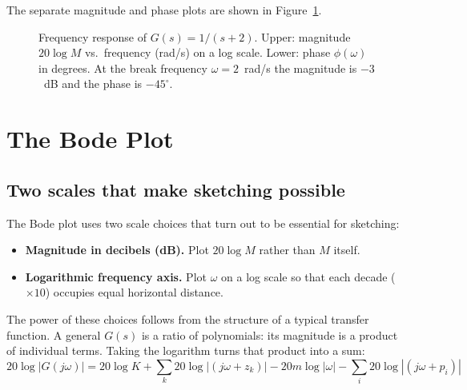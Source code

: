 \documentclass[../../book.tex]{subfiles}
\begin{document}
The separate magnitude and phase plots are shown in
Figure~\ref{fig:example_bode}.

\begin{figure}[htbp]
  \caption{Frequency response of $G(s) = 1/(s+2)$.  Upper: magnitude
    $20\log M$ vs.\ frequency (rad/s) on a log scale.  Lower: phase
    $\phi(\omega)$ in degrees.  At the break frequency $\omega = 2$~rad/s
    the magnitude is $-3$~dB and the phase is $-45^\circ$.}
  \label{fig:example_bode}
\end{figure}

\section{The Bode Plot}
\label{sec:bode_plot}

\subsection{Two scales that make sketching possible}
\label{sec:scales}

The Bode plot uses two scale choices that turn out to be essential for
sketching:
\begin{itemize}
  \item \textbf{Magnitude in decibels (dB).}  Plot $20\log M$ rather than $M$
    itself.
  \item \textbf{Logarithmic frequency axis.}  Plot $\omega$ on a log scale so
    that each decade ($\times 10$) occupies equal horizontal distance.
\end{itemize}

The power of these choices follows from the structure of a typical transfer
function.  A general $G(s)$ is a ratio of polynomials: its magnitude is a
product of individual terms.  Taking the logarithm turns that product into a
sum:
\begin{equation}
  20\log|G(j\omega)| = 20\log K
    + \sum_k 20\log|(j\omega + z_k)|
    - 20m\log|\omega|
    - \sum_i 20\log|(j\omega + p_i)|
  \label{eq:log_sum}
\end{equation}
\end{document}
